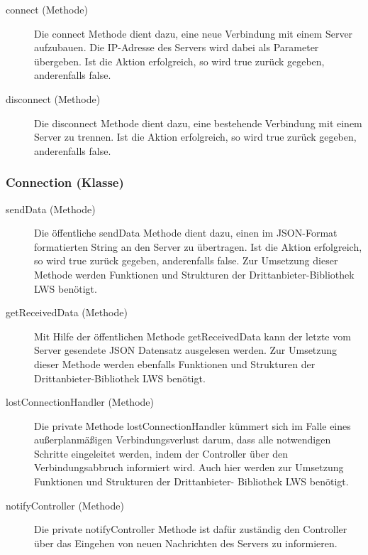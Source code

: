 		\begin{description}
                
        	\item[connect (Methode)]
        	Die connect Methode dient dazu, eine neue Verbindung mit einem Server aufzubauen. Die IP-Adresse des Servers wird dabei als Parameter übergeben. Ist die Aktion erfolgreich, so wird true zurück gegeben, anderenfalls false.
			
			\item[disconnect (Methode)]
        	Die disconnect Methode dient dazu, eine bestehende Verbindung mit einem Server zu trennen. Ist die Aktion erfolgreich, so wird true zurück gegeben, anderenfalls false.
        	
    	\end{description}
	
	\subsubsection{Connection (Klasse)}    	
	
		\begin{description}
                
        	\item[sendData (Methode)]
        	Die öffentliche sendData Methode dient dazu, einen im JSON-Format formatierten String an den Server zu übertragen. Ist die Aktion erfolgreich, so wird true zurück gegeben, anderenfalls false. Zur Umsetzung dieser Methode werden Funktionen und Strukturen der Drittanbieter-Bibliothek LWS benötigt.
        	
        	\item[getReceivedData (Methode)]
			Mit Hilfe der öffentlichen Methode getReceivedData kann der letzte vom Server gesendete JSON Datensatz ausgelesen werden. Zur Umsetzung dieser Methode werden ebenfalls Funktionen und Strukturen der Drittanbieter-Bibliothek LWS benötigt.    	
        	
        	\item[lostConnectionHandler (Methode)]
			Die private Methode lostConnectionHandler kümmert sich im Falle eines außerplanmäßigen Verbindungsverlust darum, dass alle notwendigen Schritte eingeleitet werden, indem der Controller über den Verbindungsabbruch informiert wird. Auch hier werden zur Umsetzung Funktionen und Strukturen der Drittanbieter- Bibliothek LWS benötigt.          	
        	
        	\item[notifyController (Methode)]
        	Die private notifyController Methode ist dafür zuständig den Controller über das Eingehen von neuen Nachrichten des Servers zu informieren.
        	
    	\end{description}
    	
